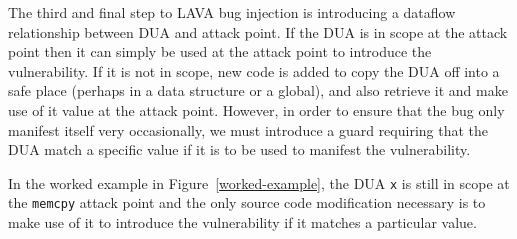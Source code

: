 The third and final step to LAVA bug injection is introducing a dataflow relationship between DUA and attack point.  
If the DUA is in scope at the attack point then it can simply be used at the attack point to introduce the vulnerability.
If it is not in scope, new code is added to copy the DUA off into a safe place (perhaps in a data structure or a global), and also retrieve it and  make use of it value at the attack point. 
However, in order to ensure that the bug only manifest itself very occasionally, we must introduce a guard requiring that the DUA match a specific value if it is to be used to manifest the vulnerability.

In the worked example in Figure~\ref{worked-example}, the DUA \verb+x+ is still in scope at the \verb+memcpy+ attack point and
 the only source code modification necessary is to make use of it to introduce the vulnerability if it matches a particular value.  










